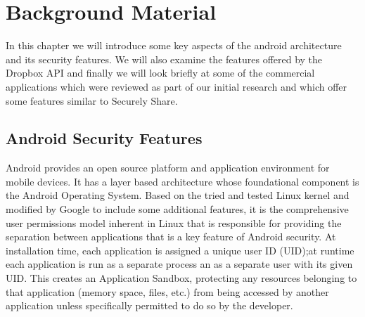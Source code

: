 
\chapter{Background Material}
\label{cha:background}

In this chapter we will introduce some key aspects of the android architecture and its security features.  We will also examine the features offered by the Dropbox API and finally we will look briefly at some of the commercial applications which were reviewed as part of our initial research and which offer some features similar to Securely Share.

\section{Android Security Features}

Android provides an open source platform and application environment for mobile devices.  It has a layer based architecture whose foundational component  is the Android Operating System.  Based on the tried and tested Linux kernel and modified by Google to include some additional features, it is the comprehensive user permissions model inherent in Linux that is responsible for providing the separation between applications that is a key feature of Android security.  At installation time, each application is assigned a unique user ID (UID);at runtime each application is run as a separate process an as a separate user with its given UID. This creates an Application Sandbox, protecting any resources belonging to that application (memory space, files, etc.) from being accessed by another application unless specifically permitted to do so by the developer.

